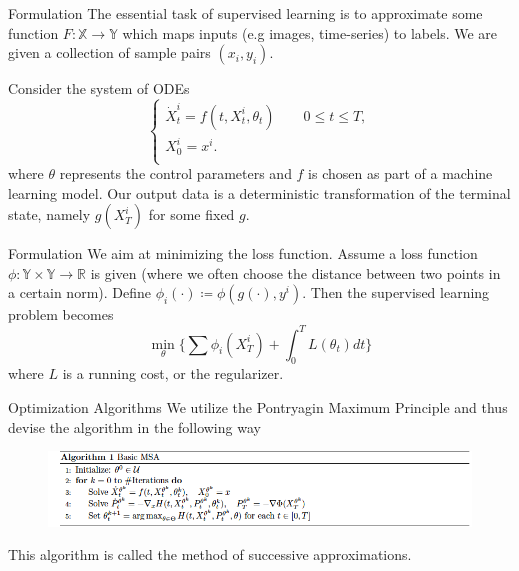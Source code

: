 \documentclass[english]{pkuslide}
\begin{document}
\begin{frame}{Formulation}
The essential task of supervised learning is to approximate some function \begin{math} F:\mathbb{X} \to \mathbb{Y} \end{math} which maps inputs (e.g images, time-series) to labels. We are given a collection of sample pairs $(x_i, y_i)$.

Consider the system of ODEs
\begin{equation}
\left\{
   \begin{array}{l}
   \dot{X}_{t}^{i}=f(t,X_{t}^{i},\theta_{t}) \qquad 0\leq t \leq T, \\
   X_{0}^{i}=x^i.  \\
   \end{array}
  \right.
\end{equation} 
where $\theta$ represents the control parameters and $f$ is chosen as part of a machine learning model. Our output data is a deterministic transformation of the terminal state, namely $g(X_{T}^{i})$ for some fixed $g$.
\end{frame}
\begin{frame}{Formulation}
We aim at minimizing the loss function. Assume a loss function \begin{math} \phi:\mathbb{Y} \times \mathbb{Y} \to \mathbb{R} \end{math} is given (where we often choose the distance between two points in a certain norm). Define \begin{math} \phi_{i}(\cdot) \coloneqq \phi(g(\cdot),y^i) \end{math}. Then the supervised learning problem becomes
\begin{equation}
\min_{\theta} \{ \sum \phi_{i}(X_{T}^{i})+\int_{0}^{T} L(\theta_t)dt\}
\end{equation}
where $L$ is a running cost, or the regularizer.
\end{frame}
\begin{frame}{Optimization Algorithms}
We utilize the Pontryagin Maximum Principle and thus devise the algorithm in the following way
\begin{figure}
\centering
\includegraphics[height=0.3\textheight]{10.png}
\end{figure}
This algorithm is called the method of successive approximations.
\end{frame}
\end{document}
